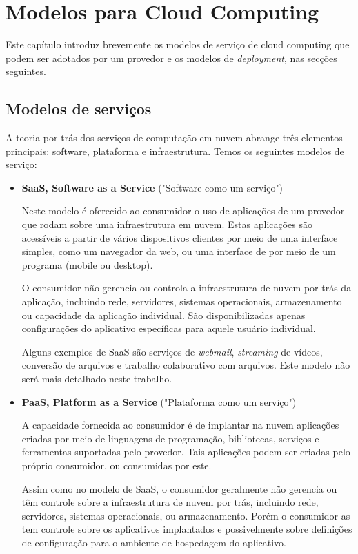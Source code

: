 \chapter{Modelos para Cloud Computing}
	Este capítulo introduz brevemente os modelos de serviço de cloud computing que podem ser adotados por um provedor e os modelos de \textit{deployment}, nas secções seguintes.

\section{Modelos de serviços}
	A teoria por trás dos serviços de computação em nuvem abrange três elementos principais: software, plataforma e infraestrutura. Temos os seguintes modelos de serviço:

	\begin{itemize}
		\item
			\textbf{SaaS, Software as a Service} ("Software como um serviço") 

			Neste modelo é oferecido ao consumidor o uso de aplicações de um provedor que rodam sobre uma infraestrutura em nuvem. Estas aplicações são acessíveis a partir de vários dispositivos clientes por meio de uma interface simples, como um navegador da web, ou uma interface de por meio de um programa (mobile ou desktop). 

			O consumidor não gerencia ou controla a infraestrutura de nuvem por trás da aplicação, incluindo rede, servidores, sistemas operacionais, armazenamento ou capacidade da aplicação individual. São disponibilizadas apenas configurações do aplicativo específicas para aquele usuário individual.

			Alguns exemplos de SaaS são serviços de \textit{webmail}, \textit{streaming} de vídeos, conversão de arquivos e trabalho colaborativo com arquivos. Este modelo não será mais detalhado neste trabalho.

		\item
			\textbf{PaaS, Platform as a Service} ("Plataforma como um serviço") 

			A capacidade fornecida ao consumidor é de implantar na nuvem aplicações criadas por meio de linguagens de programação, bibliotecas, serviços e ferramentas suportadas pelo provedor. Tais aplicações podem ser criadas pelo próprio consumidor, ou consumidas por este.

			Assim como no modelo de SaaS, o consumidor geralmente não gerencia ou têm controle sobre a infraestrutura de nuvem por trás, incluindo rede, servidores, sistemas operacionais, ou armazenamento. Porém o consumidor as tem controle sobre os aplicativos implantados e possivelmente sobre definições de configuração para o ambiente de hospedagem do aplicativo.


\end{itemize}
